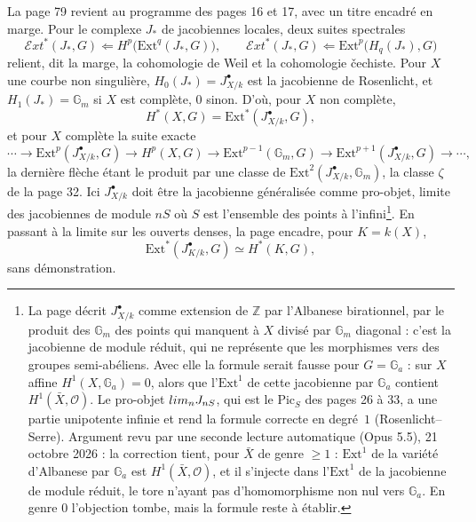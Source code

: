 \documentclass[11pt,a4paper]{article}
\begin{document}
La page 79 revient au programme des pages 16 et 17, avec un titre encadré en
marge. Pour le complexe $J_*$ de jacobiennes locales, deux suites spectrales
\[
\mathcal{E}xt^{*}(J_*, G) \Longleftarrow H^p\bigl(\mathrm{Ext}^q(J_*, G)\bigr),
\qquad
\mathcal{E}xt^{*}(J_*, G) \Longleftarrow \mathrm{Ext}^p\bigl(H_q(J_*), G\bigr)
\]
relient, dit la marge, la cohomologie de Weil et la cohomologie čechiste. Pour
$X$ une courbe non singulière, $H_0(J_*) = J^{\bullet}_{X/k}$ est la jacobienne
de Rosenlicht, et $H_1(J_*) = \mathbb{G}_m$ si $X$ est complète, $0$ sinon. D'où,
pour $X$ non complète,
\[
H^{*}(X, G) = \mathrm{Ext}^{*}(J^{\bullet}_{X/k}, G),
\]
et pour $X$ complète la suite exacte
\[
\cdots \to \mathrm{Ext}^p(J^{\bullet}_{X/k}, G) \to H^p(X, G) \to
\mathrm{Ext}^{p-1}(\mathbb{G}_m, G) \to \mathrm{Ext}^{p+1}(J^{\bullet}_{X/k}, G) \to
\cdots,
\]
la dernière flèche étant le produit par une classe de
$\mathrm{Ext}^2(J^{\bullet}_{X/k}, \mathbb{G}_m)$, la classe $\zeta$ de la
page 32. Ici $J^{\bullet}_{X/k}$ doit être la jacobienne généralisée comme
pro-objet, limite des jacobiennes de module $nS$ où $S$ est l'ensemble des
points à l'infini\footnote{La page décrit $J^{\bullet}_{X/k}$ comme extension de
$\mathbb{Z}$ par l'Albanese birationnel, par le produit des $\mathbb{G}_m$ des
points qui manquent à $X$ divisé par $\mathbb{G}_m$ diagonal : c'est la jacobienne
de module réduit, qui ne représente que les morphismes vers des groupes
semi-abéliens. Avec elle la formule serait fausse pour $G = \mathbb{G}_a$ : sur
$X$ affine $H^1(X, \mathbb{G}_a) = 0$, alors que l'$\mathrm{Ext}^1$ de cette
jacobienne par $\mathbb{G}_a$ contient $H^1(\bar X, \mathcal{O})$. Le pro-objet
$\varprojlim_n J_{nS}$, qui est le $\mathrm{Pic}_{S}$ des pages 26 à 33, a une
partie unipotente infinie et rend la formule correcte en degré~$1$ (Rosenlicht--Serre). Argument revu par une seconde lecture automatique (Opus 5.5), 21 octobre 2026 : la correction tient, pour $\bar X$ de genre $\geq 1$ : $\mathrm{Ext}^{1}$ de la variété d'Albanese par $\mathbb{G}_a$ est $H^{1}(\bar X, \mathcal{O})$, et il s'injecte dans l'$\mathrm{Ext}^{1}$ de la jacobienne de module réduit, le tore n'ayant pas d'homomorphisme non nul vers $\mathbb{G}_a$. En genre $0$ l'objection tombe, mais la formule reste à établir.}. En passant à la limite sur les ouverts denses, la page
encadre, pour $K = k(X)$,
\[
\mathrm{Ext}^{*}(J^{\bullet}_{K/k}, G) \simeq H^{*}(K, G),
\]
sans démonstration.
\end{document}
